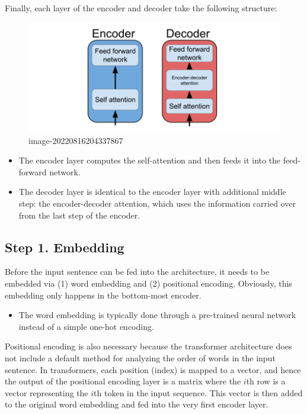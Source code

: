 \documentclass[
]{book}
\providecommand{\tightlist}{%
  \setlength{\itemsep}{0pt}\setlength{\parskip}{0pt}}
\begin{document}
Finally, each layer of the encoder and decoder take the following structure:

\begin{figure}
\centering
\includegraphics{Figures/transformers_03.png}
\caption{image-20220816204337867}
\end{figure}

\begin{itemize}
\tightlist
\item
  The encoder layer computes the self-attention and then feeds it into the feed-forward network.
\item
  The decoder layer is identical to the encoder layer with additional middle step: the encoder-decoder attention, which uses the information carried over from the last step of the encoder.
\end{itemize}

\hypertarget{step-1.-embedding}{%
\subsection{Step 1. Embedding}\label{step-1.-embedding}}

Before the input sentence can be fed into the architecture, it needs to be embedded via (1) word embedding and (2) positional encoding. Obviously, this embedding only happens in the bottom-most encoder.

\begin{itemize}
\tightlist
\item
  The word embedding is typically done through a pre-trained neural network instead of a simple one-hot encoding.
\end{itemize}

Positional encoding is also necessary because the transformer architecture does not include a default method for analyzing the order of words in the input sentence. In transformers, each position (index) is mapped to a vector, and hence the output of the positional encoding layer is a matrix where the \(i\)th row is a vector representing the \(i\)th token in the input sequence. This vector is then added to the original word embedding and fed into the very first encoder layer.
\end{document}

